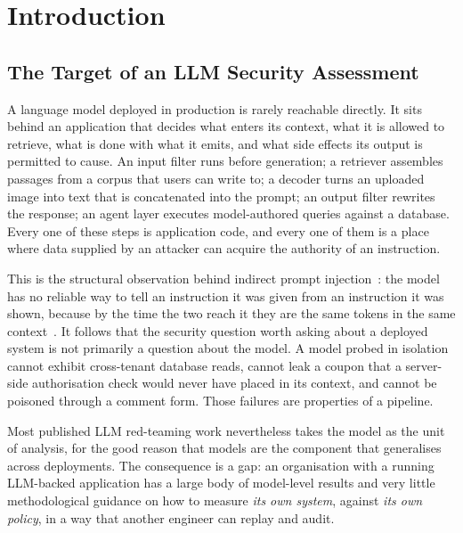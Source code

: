 \section{Introduction}
\label{sec:introduction}

\subsection{The Target of an LLM Security Assessment}
\label{sec:intro:target}

A language model deployed in production is rarely reachable directly.
It sits behind an application that decides what enters its context, what
it is allowed to retrieve, what is done with what it emits, and what
side effects its output is permitted to cause. An input filter runs
before generation; a retriever assembles passages from a corpus that
users can write to; a decoder turns an uploaded image into text that is
concatenated into the prompt; an output filter rewrites the response;
an agent layer executes model-authored queries against a database. Every
one of these steps is application code, and every one of them is a place
where data supplied by an attacker can acquire the authority of an
instruction.

This is the structural observation behind indirect prompt
injection~\cite{greshake2023}: the model has no reliable way to tell an
instruction it was given from an instruction it was shown, because by
the time the two reach it they are the same tokens in the same
context~\cite{wallace2024hierarchy}. It follows that the security
question worth asking about a deployed system is not primarily a
question about the model. A model probed in isolation cannot exhibit
cross-tenant database reads, cannot leak a coupon that a server-side
authorisation check would never have placed in its context, and cannot
be poisoned through a comment form. Those failures are properties of a
pipeline.

Most published LLM red-teaming work nevertheless takes the model as the
unit of analysis, for the good reason that models are the component
that generalises across deployments. The consequence is a gap: an
organisation with a running LLM-backed application has a large body of
model-level results and very little methodological guidance on how to
measure \emph{its own system}, against \emph{its own policy}, in a way
that another engineer can replay and audit.

